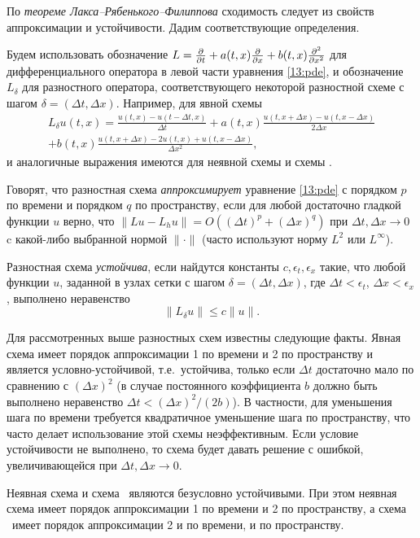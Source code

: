 По \emph{теореме Лакса--Рябенького--Филиппова} сходимость следует из свойств аппроксимации и устойчивости.
Дадим соответствующие определения.

Будем использовать обозначение $L = \frac{\partial }{\partial t} + a(t,x)\frac{\partial }{\partial x} + b(t,x)\frac{\partial^2 }{\partial x^2}$ для дифференциального оператора в левой части уравнения \eqref{13:pde}, и обозначение $L_\delta$ для разностного оператора, соответствующего некоторой разностной схеме с шагом $\delta=(\Delta t, \Delta x)$.
Например, для явной схемы 
\begin{multline*}
L_\delta u(t,x) = \frac{u(t,x) - u(t-\Delta t, x)}{\Delta t} + a(t,x) \frac{u(t,x+\Delta x) - u(t,x-\Delta x)}{2\Delta x} \\
+ b(t,x) \frac{u(t,x+\Delta x) - 2u(t,x) + u(t,x-\Delta x)}{\Delta x^2},
\end{multline*}
и аналогичные выражения имеются для неявной схемы и схемы \cn.

Говорят, что разностная схема \emph{аппроксимирует} уравнение \eqref{13:pde} с порядком $p$ по времени и порядком $q$ по пространству, если для любой достаточно гладкой функции $u$ верно, что  $\|L u - L_h u\| = O((\Delta t)^p + (\Delta x)^q)$ при $\Delta t, \Delta x \to 0$ c какой-либо выбранной нормой $\|\cdot\|$ (часто используют норму $L^2$ или $L^\infty$).

Разностная схема \emph{устойчива}, если найдутся константы $c,\epsilon_t,\epsilon_x$ такие, что любой  функции $u$, заданной в узлах сетки с шагом $\delta=(\Delta t, \Delta x)$, где $\Delta t < \epsilon_t$, $\Delta x < \epsilon_x$, выполнено неравенство
\[
\|L_\delta u\| \le c \|u\|.
\]

Для рассмотренных выше разностных схем известны следующие факты.
Явная схема имеет порядок аппроксимации 1 по времени и 2 по пространству и является условно-устойчивой, т.е.\ устойчива, только если $\Delta t$ достаточно мало по сравнению с $(\Delta x)^2$ (в случае постоянного коэффициента $b$ должно быть выполнено неравенство $\Delta t < (\Delta x)^2 / (2b)$).
В частности, для уменьшения шага по времени требуется квадратичное уменьшение шага по пространству, что часто делает использование этой схемы неэффективным.
Если условие устойчивости не выполнено, то схема будет давать решение с ошибкой, увеличивающейся  при $\Delta t,\Delta x\to 0$.

Неявная схема и схема \cn\ являются безусловно устойчивыми. При этом неявная схема имеет порядок аппроксимации 1 по времени и 2 по пространству, а схема \cn\ имеет порядок аппроксимации 2 и по времени, и по пространству.

